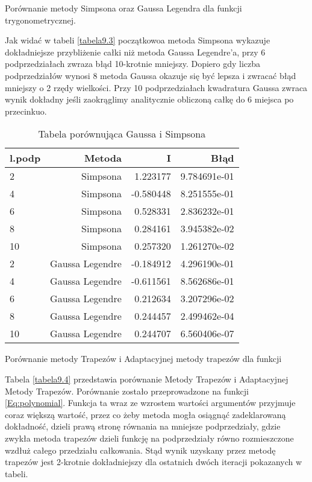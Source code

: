 \documentclass[12pt,twoside]{article}
\begin{document}
Porównanie metody Simpsona oraz Gaussa Legendra dla funkcji trygonometrycznej.

Jak widać w tabeli \eqref{tabela9.3} początkowoa metoda Simpsona wykazuje dokładniejsze przybliżenie całki niż metoda Gaussa Legendre'a, przy 6 podprzedziałach zwraza błąd 10-krotnie mniejszy. Dopiero gdy liczba podprzedziałów wynosi 8 metoda Gaussa okazuje się być lepsza i zwracać błąd mniejszy o 2 rzędy wielkości. 
Przy 10 podprzedziałach kwadratura Gaussa zwraca wynik dokładny jeśli zaokrąglimy analitycznie obliczoną całkę do 6 miejsca po przecinkuo.

\begin{table}
\centering 
\caption{Tabela porównująca Gaussa i Simpsona }
\label{tabela9.3}
\begin{tabular}{lrrr}
\toprule
{l.podp} & Metoda &  I &  Błąd \\
\midrule
2  &     Simpsona & 1.223177 &   9.784691e-01 \\
4  &     Simpsona & -0.580448  &   8.251555e-01  \\
6  &     Simpsona &  0.528331  &   2.836232e-01  \\
8  &     Simpsona & 0.284161 &   3.945382e-02  \\
10 &     Simpsona & 0.257320 &   1.261270e-02  \\
2  &     Gaussa Legendre & -0.184912 &  4.296190e-01   \\
4  &     Gaussa Legendre & -0.611561 &  8.562686e-01   \\
6  &     Gaussa Legendre & 0.212634 &  3.207296e-02   \\
8  &     Gaussa Legendre & 0.244457 &  2.499462e-04  \\
10 &     Gaussa Legendre & 0.244707 &  6.560406e-07  \\

\bottomrule
\end{tabular}
\end{table}




Porównanie metody Trapezów i Adaptacyjnej metody trapezów dla funkcji 

Tabela \eqref{tabela9.4} przedstawia porównanie Metody Trapezów i Adaptacyjnej Metody Trapezów. Porównanie zostało przeprowadzone na funkcji \eqref{Eq:polynomial}. Funkcja ta wraz ze wzrostem wartości argumentów przyjmuje coraz większą wartość, przez co żeby metoda mogła osiągnąć zadeklarowaną dokładność, dzieli prawą stronę równania na mniejsze podprzedziały, gdzie zwykła metoda trapezów dzieli funkcję na podprzedziały równo rozmieszczone wzdłuż całego przedziału całkowania. Stąd wynik uzyskany przez metodę trapezów jest 2-krotnie dokładniejszy dla ostatnich dwóch iteracji pokazanych w tabeli.
\end{document}
